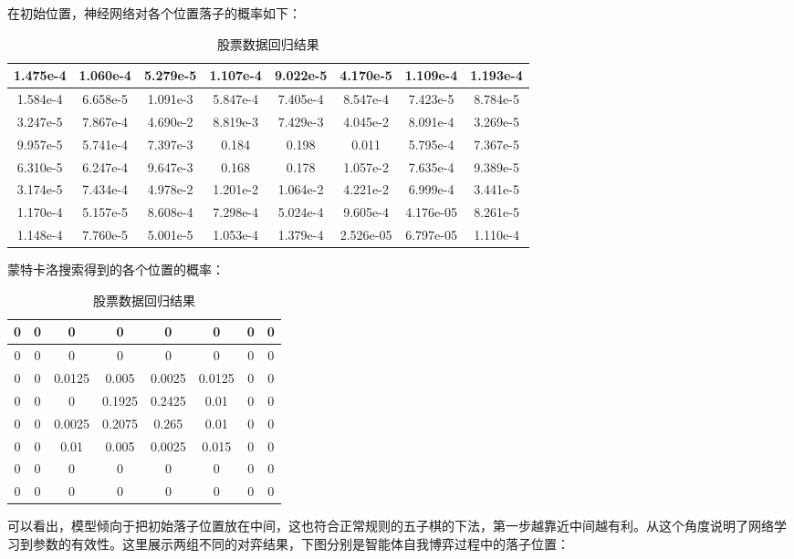 在初始位置，神经网络对各个位置落子的概率如下：
\begin{table}[t]
	\centering
	\caption{股票数据回归结果}
\begin{tabular}{|c|c|c|c|c|c|c|c|}
	\hline 
	1.475e-4 & 1.060e-4 & 5.279e-5 & 1.107e-4 & 9.022e-5 & 4.170e-5 & 1.109e-4 & 1.193e-4 \\ 
	\hline 
	1.584e-4 & 6.658e-5 & 1.091e-3 & 5.847e-4 & 7.405e-4 & 8.547e-4 & 7.423e-5 & 8.784e-5 \\ 
	\hline 
	3.247e-5 & 7.867e-4& 4.690e-2 & 8.819e-3 & 7.429e-3&4.045e-2 & 8.091e-4 & 3.269e-5 \\ 
	\hline 
	9.957e-5& 5.741e-4 & 7.397e-3 & 0.184 & 0.198 & 0.011& 5.795e-4 & 7.367e-5 \\ 
	\hline 
	6.310e-5 &6.247e-4& 9.647e-3& 0.168 & 0.178 & 1.057e-2 & 7.635e-4 & 9.389e-5 \\ 
	\hline 
	3.174e-5 & 7.434e-4 & 4.978e-2 & 1.201e-2 & 1.064e-2 & 4.221e-2 & 6.999e-4 & 3.441e-5 \\ 
	\hline 
	1.170e-4 & 5.157e-5& 8.608e-4 & 7.298e-4 & 5.024e-4 & 9.605e-4 & 4.176e-05 & 8.261e-5\\ 
	\hline 
	1.148e-4 &7.760e-5 &  5.001e-5 & 1.053e-4 & 1.379e-4 & 2.526e-05 & 6.797e-05 & 1.110e-4 \\ 
	\hline 
\end{tabular} 
\end{table}

蒙特卡洛搜索得到的各个位置的概率：
\begin{table}[b]
	\centering
	\caption{股票数据回归结果}
\begin{tabular}{|c|c|c|c|c|c|c|c|}
		\hline 
		0& 0 & 0 & 0 & 0 & 0 &  0&  0\\ 
		\hline 
		0& 0 & 0 & 0 & 0 & 0 &  0&  0\\ 
		\hline 
		0 & 0 & 0.0125 & 0.005 & 0.0025 & 0.0125 & 0 & 0 \\ 
		\hline 
		0 & 0 & 0 & 0.1925 & 0.2425 & 0.01 & 0 & 0 \\ 
		\hline 
		0 & 0 & 0.0025 & 0.2075 & 0.265 & 0.01 & 0 & 0 \\ 
		\hline 
		0 & 0 & 0.01 & 0.005 & 0.0025 & 0.015 & 0 & 0 \\ 
		\hline 
		0 & 0 & 0 & 0 & 0 & 0 & 0 & 0 \\ 
		\hline 
		0 & 0 & 0 & 0 & 0 & 0 & 0 & 0 \\  
		\hline 
\end{tabular} 
\end{table}

可以看出，模型倾向于把初始落子位置放在中间，这也符合正常规则的五子棋的下法，第一步越靠近中间越有利。从这个角度说明了网络学习到参数的有效性。这里展示两组不同的对弈结果，下图分别是智能体自我博弈过程中的落子位置：

